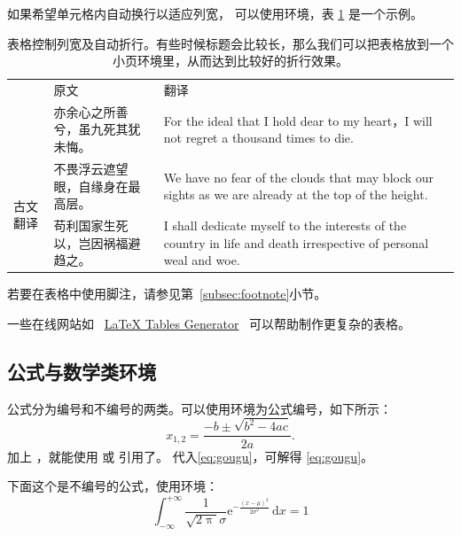 如果希望单元格内自动换行以适应列宽，
可以使用环境，表 \ref{tab:tabularx} 是一个示例。
\begin{table}[htbp]
	\centering
	\begin{minipage}{0.9\textwidth}
		\caption{表格控制列宽及自动折行。有些时候标题会比较长，那么我们可以把表格放到一个小页环境里，从而达到比较好的折行效果。}
		\label{tab:tabularx}
		\begin{tabularx}{\textwidth}{p{4em}p{7.5em}X}
			\toprule
									& \multicolumn{1}{l}{原文}         & \multicolumn{1}{l}{翻译}                                                                                         \\
			\cmidrule(l){2-3}
									& 亦余心之所善兮，虽九死其犹未悔。 & For the ideal that I hold dear to my heart，I will not regret a thousand times to die.                           \\
			\cmidrule(l){2-3}
			\multirow{3}{*}{古文翻译} & 不畏浮云遮望眼，自缘身在最高层。 & We have no fear of the clouds that may block our sights as we are already at the top of the height.              \\
			\cmidrule(l){2-3}
									& 苟利国家生死以，岂因祸福避趋之。 & I shall dedicate myself to the interests of the country in life and death irrespective of personal weal and woe. \\
			\bottomrule
		\end{tabularx}
	\end{minipage}
\end{table}

若要在表格中使用脚注，请参见第~\ref{subsec:footnote}小节。

一些在线网站如
~\href{http://www.tablesgenerator.com}{LaTeX Tables Generator}~
可以帮助制作更复杂的表格。


\subsection{公式与数学类环境}\label{subsec:eqandmath}
公式分为编号和不编号的两类。可以使用环境为公式编号，如下所示：
\begin{equation}\label{eq:gougu}
	x_{1,2}=\frac{{-b \pm \sqrt{{b^2}-4ac}}}{{2a}}.
\end{equation}
加上 ，就能使用 或 引用了。
代入\ref{eq:gougu}，可解得 \eqref{eq:gougu}。

下面这个是不编号的公式，使用环境：
\begin{equation*}
	\int_{-\infty}^{+\infty}\frac{1}{\sqrt{2\uppi}\sigma}		%
	\mathrm{e}^{-\tfrac{(x-\mu)^2}{2\sigma^2}} \,\mathrm{d}x =1
\end{equation*}

